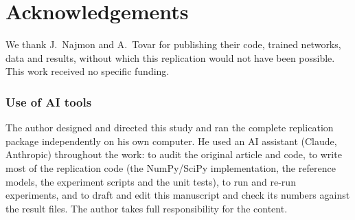 \section*{Acknowledgements}
We thank J.~Najmon and A.~Tovar for publishing their code, trained networks,
data and results, without which this replication would not have been possible.
This work received no specific funding.

\subsubsection{Use of AI tools} The author designed and directed this study and
ran the complete replication package independently on his own computer. He used
an AI assistant (Claude, Anthropic) throughout the work: to audit the original
article and code, to write most of the replication code (the NumPy/SciPy
implementation, the reference models, the experiment scripts and the unit
tests), to run and re-run experiments, and to draft and edit this manuscript and
check its numbers against the result files. The author takes full
responsibility for the content.
